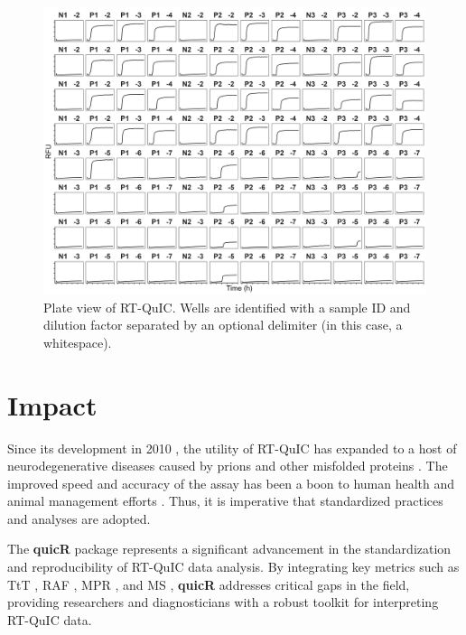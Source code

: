 \documentclass[preprint,12pt,a4paper]{elsarticle}
\begin{document}
            \begin{figure}[ht]
                \centering
                \includegraphics[width=\textwidth]{images/plate_view.png}
                \caption{Plate view of RT-QuIC. Wells are identified with a sample ID and dilution factor separated by an optional delimiter (in this case, a whitespace).}
                \label{fig:plateview}
            \end{figure}
            
    \section{Impact}
        Since its development in 2010 \cite{Wilham2010,Atarashi2011}, the utility of RT-QuIC has expanded to a host of neurodegenerative diseases caused by prions and other misfolded proteins \cite{Orru2024,ALWAKIL202597,Wang2024}. The improved speed and accuracy of the assay has been a boon to human health \cite{Orru2015,green2019rt,race2019transmission,vascellari2022real} and animal management efforts \cite{huang2025chronic,cooper2019detection,piel2024validation,harpaz2024transmission}. Thus, it is imperative that standardized practices and analyses are adopted.

        The \textbf{quicR} package represents a significant advancement in the standardization and reproducibility of RT-QuIC data analysis. By integrating key metrics such as TtT \cite{Orru2015}, RAF \cite{Gallups2022}, MPR \cite{Rowden2023}, and MS \cite{Henderson2015}, \textbf{quicR} addresses critical gaps in the field, providing researchers and diagnosticians with a robust toolkit for interpreting RT-QuIC data.
\end{document}
